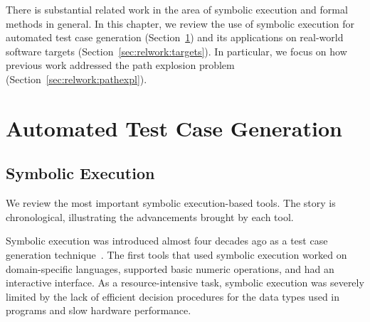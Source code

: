 There is substantial related work in the area of symbolic execution and formal methods in general.  In this chapter, we review the use of symbolic execution for automated test case generation (Section~\ref{sec:relwork:atcg}) and its applications on real-world software targets (Section~\ref{sec:relwork:targets}).  In particular, we focus on how previous work addressed the path explosion problem (Section~\ref{sec:relwork:pathexpl}).

\section{Automated Test Case Generation}
\label{sec:relwork:atcg}

\subsection{Symbolic Execution}

We review the most important symbolic execution-based tools.  The story is chronological, illustrating the advancements brought by each tool.


Symbolic execution was introduced almost four decades ago as a test case generation technique~\cite{king:symbolic:2, boyer:symbolic}.  The first tools that used symbolic execution worked on domain-specific languages, supported basic numeric operations, and had an interactive interface.  As a resource-intensive task, symbolic execution was severely limited by the lack of efficient decision procedures for the data types used in programs and slow hardware performance.


